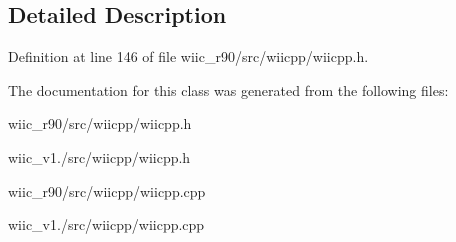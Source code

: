 \subsection{Detailed Description}


Definition at line 146 of file wiic\-\_\-r90/src/wiicpp/wiicpp.\-h.



The documentation for this class was generated from the following files\-:\begin{DoxyCompactItemize}
\item 
wiic\-\_\-r90/src/wiicpp/wiicpp.\-h\item 
wiic\-\_\-v1./src/wiicpp/wiicpp.\-h\item 
wiic\-\_\-r90/src/wiicpp/wiicpp.\-cpp\item 
wiic\-\_\-v1./src/wiicpp/wiicpp.\-cpp\end{DoxyCompactItemize}
